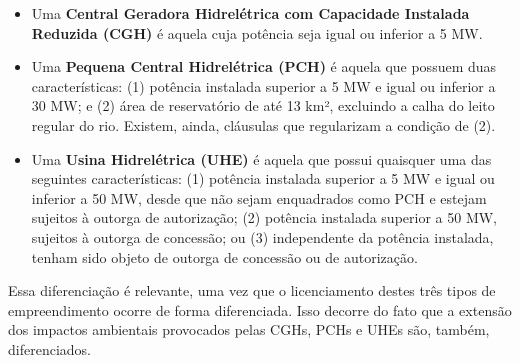 \documentclass[aprovado,numbers]{coppe}
\providecommand{\tightlist}{%
  \setlength{\itemsep}{0pt}\setlength{\parskip}{0pt}}
\begin{document}
  \begin{itemize}
  \tightlist
  \item
    Uma \textbf{Central Geradora Hidrelétrica com Capacidade Instalada Reduzida (CGH)} é aquela cuja potência seja igual ou inferior a 5 MW.
  \item
    Uma \textbf{Pequena Central Hidrelétrica (PCH)} é aquela que possuem duas características: (1) potência instalada superior a 5 MW e igual ou inferior a 30 MW; e (2) área de reservatório de até 13 km², excluindo a calha do leito regular do rio. Existem, ainda, cláusulas que regularizam a condição de (2).
  \item
    Uma \textbf{Usina Hidrelétrica (UHE)} é aquela que possui quaisquer uma das seguintes características: (1) potência instalada superior a 5 MW e igual ou inferior a 50 MW, desde que não sejam enquadrados como PCH e estejam sujeitos à outorga de autorização; (2) potência instalada superior a 50 MW, sujeitos à outorga de concessão; ou (3) independente da potência instalada, tenham sido objeto de outorga de concessão ou de autorização.
  \end{itemize}
  Essa diferenciação é relevante, uma vez que o licenciamento destes três tipos de empreendimento ocorre de forma diferenciada. Isso decorre do fato que a extensão dos impactos ambientais provocados pelas CGHs, PCHs e UHEs são, também, diferenciados.
\end{document}

